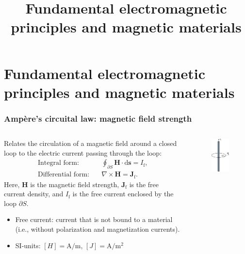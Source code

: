 \section{Fundamental electromagnetic principles and magnetic materials}
\title[Electromagnetic and material fundamentals]{Fundamental electromagnetic principles and magnetic materials}  

\begin{frame}[plain]
    \titlepage
\end{frame}

\begin{frame}
	\frametitle{Amp\`ere's circuital law: magnetic field strength}
	\begin{columns}
		\begin{column}{0.55\textwidth}
			Relates the circulation of a magnetic field around a closed loop to the electric current passing through the loop:
            \begin{align}
                \mbox{Integral form:} \quad &\oint_{\partial S} \bm{H} \cdot \mathrm{d}\bm{s} = I_{\mathrm{f}},\\
                \mbox{Differential form:} \quad &\nabla \times \bm{H} = \bm{J}_{\mathrm{f}}. 
                \label{eq:ampere_law}
            \end{align}
            Here, $\bm{H}$ is the magnetic field strength, $\bm{J}_{\mathrm{f}}$ is the free current density, and $I_{\mathrm{f}}$ is the free current enclosed by the loop $\partial S$. 
            \vspace{0.25cm}
            \begin{itemize}
                \item<2-> Free current: current that is not bound to a material (i.e., without polarization and magnetization currents).
                \item<3-> SI-units: $[H] = \si{\ampere\per\metre}$, $[J] = \si{\ampere\per\metre\squared}$
            \end{itemize}
		\end{column}
        \hfill
		\begin{column}{0.4\textwidth}
			\begin{figure}
				\centering
				\includegraphics[height=0.7\textheight]{fig/lec02/Magnetic_field_strength_simple_conductor.pdf}

\end{figure}
\end{column}
\end{columns}
\end{frame}
